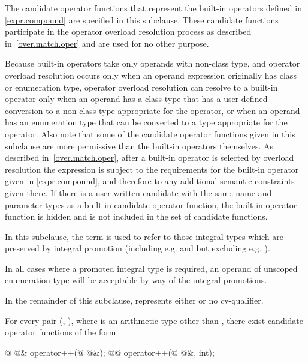 \pnum
The candidate operator functions that represent the built-in operators
defined in \ref{expr.compound} are specified in this subclause.
These candidate
functions participate in the operator overload resolution process as
described in~\ref{over.match.oper} and are used for no other purpose.
\begin{note}
Because built-in operators take only operands with non-class type,
and operator overload resolution occurs only when an operand expression
originally has class or enumeration type,
operator overload resolution can resolve to a built-in operator only
when an operand has a class type that has a user-defined conversion to
a non-class type appropriate for the operator, or when an operand has
an enumeration type that can be converted to a type appropriate
for the operator.
Also note that some of the candidate operator functions given in this subclause are
more permissive than the built-in operators themselves.
As
described in~\ref{over.match.oper}, after a built-in operator is selected
by overload resolution the expression is subject to the requirements for
the built-in operator given in \ref{expr.compound}, and therefore to any
additional semantic constraints given there.
If there is a user-written
candidate with the same name and parameter types as a built-in
candidate operator function, the built-in operator function
is hidden and is not included in the set of candidate functions.
\end{note}

\pnum
{}%
%
In this subclause, the term
is used to refer to those integral types which are preserved by
integral promotion (including e.g.
and
but excluding e.g.
).
\begin{note}
In all cases where a promoted integral type is
required, an operand of unscoped enumeration type will be acceptable by way of the
integral promotions.
\end{note}

\pnum
In the remainder of this subclause,  represents either
 or no cv-qualifier.

\pnum
For every pair
(,
),
where
is an arithmetic type other than ,
there exist candidate operator functions of the form
\begin{codeblock}
@ @& operator++(@ @&);
@@ operator++(@ @&, int);
\end{codeblock}

